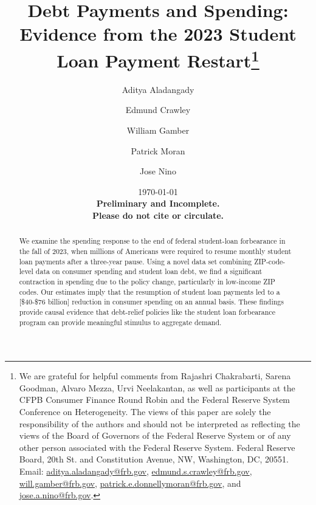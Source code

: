 \documentclass[12pt]{article}
\title{ \vspace*{-2.5cm} \hspace*{-0.5cm} 
Debt Payments and Spending: Evidence from the 2023 Student Loan Payment Restart\footnote{
We are grateful for helpful comments from Rajashri Chakrabarti, Sarena Goodman, Alvaro Mezza, Urvi Neelakantan, as well as participants at the CFPB Consumer Finance Round Robin and the Federal Reserve System Conference on Heterogeneity. The views of this paper are solely the responsibility of the authors and should not be interpreted as reflecting the views of the Board of Governors of the Federal Reserve System or of any other person associated with the Federal Reserve System. Federal Reserve Board, 20th St. and Constitution Avenue, NW, Washington, DC, 20551. Email: \href{mailto:aditya.aladangady@frb.gov}{aditya.aladangady@frb.gov}, \href{mailto:EMAIL}{edmund.s.crawley@frb.gov}, \href{mailto:will.gamber@frb.gov}{will.gamber@frb.gov}, \href{mailto:EMAIL}{patrick.e.donnellymoran@frb.gov}, and \href{mailto:jose.a.nino@frb.gov}{jose.a.nino@frb.gov}.
}
}
\author{
    Aditya Aladangady 
    \and Edmund Crawley
    \and William Gamber 
    \and Patrick Moran 
    \and Jose Nino 
}
\date{ \vspace*{0.5cm} \today \\
\textbf{Preliminary and Incomplete. \\ Please do not cite or circulate.}
}
\begin{document}
\bgroup
\let\footnoterule\relax

\begin{singlespace}
\maketitle

\begin{abstract}
    \noindent 

    \noindent
    We examine the spending response to the end of federal student-loan forbearance in the fall of 2023, when millions of Americans were required to resume monthly student loan payments after a three-year pause. Using a novel data set combining ZIP-code-level data on consumer spending and student loan debt, we find a significant contraction in spending due to the policy change, particularly in low-income ZIP codes. Our estimates imply that the resumption of student loan payments led to a [\$40-\$76 billion] reduction in consumer spending on an annual basis. These findings provide causal evidence that debt-relief policies like the student loan forbearance program can provide meaningful stimulus to aggregate demand.

\end{abstract}
\end{singlespace}
\thispagestyle{empty}
\end{document}
